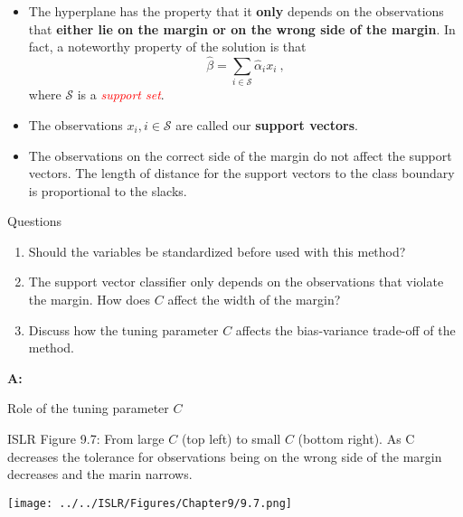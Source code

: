 \documentclass[10pt,ignorenonframetext,]{beamer}
\begin{document}
\begin{frame}

\begin{itemize}
\item
  The hyperplane has the property that it \textbf{only} depends on the
  observations that \textbf{either lie on the margin or on the wrong
  side of the margin}. In fact, a noteworthy property of the solution is
  that \[\hat{\beta}= \sum_{i\in \mathcal{S}} \hat\alpha_i x_i \ ,\]
  where \(\mathcal{S}\) is a \emph{\textcolor{red}{support set}}.
\item
  The observations \(x_i, i \in \mathcal{S}\) are called our
  \textbf{support vectors}.
\item
  The observations on the correct side of the margin do not affect the
  support vectors. The length of distance for the support vectors to the
  class boundary is proportional to the slacks.
\end{itemize}

\end{frame}

\begin{frame}

\begin{block}{Questions}

\vspace{2mm}

\begin{enumerate}
\item
  Should the variables be standardized before used with this method?
\item
  The support vector classifier only depends on the observations that
  violate the margin. How does \(C\) affect the width of the margin?
\item
  Discuss how the tuning parameter \(C\) affects the bias-variance
  trade-off of the method.
\end{enumerate}

\end{block}

\end{frame}

\begin{frame}

\textbf{A:}

\end{frame}

\begin{frame}

\begin{block}{Role of the tuning parameter \(C\)}

ISLR Figure 9.7: From large \(C\) (top left) to small \(C\) (bottom
right). As C decreases the tolerance for observations being on the wrong
side of the margin decreases and the marin narrows.

\centering

\texttt{[image: ../../ISLR/Figures/Chapter9/9.7.png]}

\end{block}

\end{frame}
\end{document}
